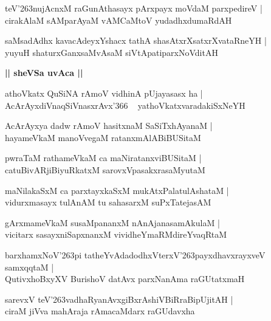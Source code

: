 \documentclass[twoside,12pt,openright]{book}
\def\S{\char'263}
\newcounter{shloka}[chapter]
\def\uvaca#1{\centerline{{\large\textbf{#1}}}}
\begin{document}
\begin{shloka}%
teV\S nujAcnxM raGunAthasayx pArxpayx moVdaM parxpedireV |\\
cirakAlaM sAMparAyaM vAMCaMtoV yudadhxdumaRdAH 
\end{shloka}

\begin{shloka}%
saMsadAdhx kavacAdeyxYshacx tathA shasAtxrXsatxrXvataRneYH |\\
yuyuH shaturxGanxsaMvAsaM siVtApatiparxNoVditAH 
\end{shloka}

\uvaca{|| sheVSa uvAca ||}

\begin{shloka}%
athoVkatx QuSiNA rAmoV vidhinA pUjayasasx ha |\\
AcArAyxdiVnaqSiVnasxrAvx\char'366 ~ yathoVkatxvaradakiSxNeYH 
\end{shloka}

\begin{shloka}%
AcArAyxya dadw rAmoV hasitxnaM SaSiTxhAyanaM |\\
hayameVkaM manoVvegaM ratanxmAlABiBUSitaM 
\end{shloka}

\begin{shloka}%
pwraTaM rathameVkaM ca maNiratanxviBUSitaM |\\
catuBivARjiBiyuRkatxM sarovxVpasakxrasaMyutaM 
\end{shloka}

\begin{shloka}%
maNilakaSxM ca parxtayxkaSxM mukAtxPalatulAshataM |\\
vidurxmasayx tulAnAM tu sahasarxM suPxTatejasAM 
\end{shloka}

\begin{shloka}%
gArxmameVkaM susaMpananxM nAnAjanasamAkulaM |\\
vicitarx sasayxniSapxnanxM vividheYmaRMdireYvaqRtaM 
\end{shloka}

\begin{shloka}%
barxhamxNoV\S pi tatheYvAdadodhxVterxV\S payxdhavxrayxveV samxqqtaM |\\
QutivxhoBxyXV BurishoV datAvx parxNanAma raGUtatxmaH
\end{shloka}

\begin{shloka}%
sarevxV teV\S vadhaRyanAvxgiBxrAshiVBiRraBipUjitAH |\\
ciraM jiVva mahAraja rAmacaMdarx raGUdavxha
\end{shloka}
\end{document}
